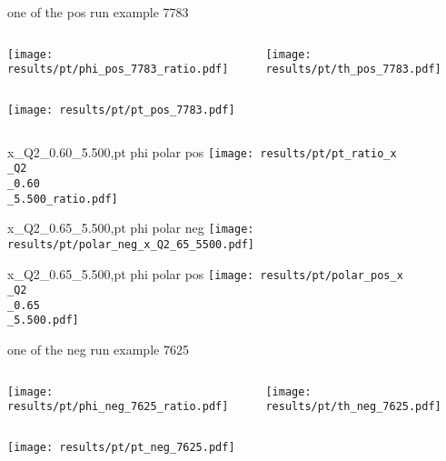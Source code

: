 \begin{frame}{one of the pos run example 7783}
\begin{columns}
\begin{column}[T]{0.5\textwidth}
\texttt{[image: results/pt/phi\_pos\_7783\_ratio.pdf]}
\end{column}
\begin{column}[T]{0.5\textwidth}
\texttt{[image: results/pt/th\_pos\_7783.pdf]}
\end{column}
\end{columns}
\begin{columns}
\begin{column}[T]{0.5\textwidth}
\texttt{[image: results/pt/pt\_pos\_7783.pdf]}
\end{column}
\begin{column}[T]{0.5\textwidth}
\end{column}
\end{columns}
\end{frame}
\begin{frame}{x\_Q2\_0.60\_5.500,pt phi polar pos}
\texttt{[image: results/pt/pt\_ratio\_x\\\_Q2\\\_0.60\\\_5.500\_ratio.pdf]}
\end{frame}
\begin{frame}{x\_Q2\_0.65\_5.500,pt phi polar neg}
\texttt{[image: results/pt/polar\_neg\_x\_Q2\_65\_5500.pdf]}
\end{frame}
\begin{frame}{x\_Q2\_0.65\_5.500,pt phi polar pos}
\texttt{[image: results/pt/polar\_pos\_x\\\_Q2\\\_0.65\\\_5.500.pdf]}
\end{frame}
\begin{frame}{one of the neg run example 7625}
\begin{columns}
\begin{column}[T]{0.5\textwidth}
\texttt{[image: results/pt/phi\_neg\_7625\_ratio.pdf]}
\end{column}
\begin{column}[T]{0.5\textwidth}
\texttt{[image: results/pt/th\_neg\_7625.pdf]}
\end{column}
\end{columns}
\texttt{[image: results/pt/pt\_neg\_7625.pdf]}
\end{frame}

